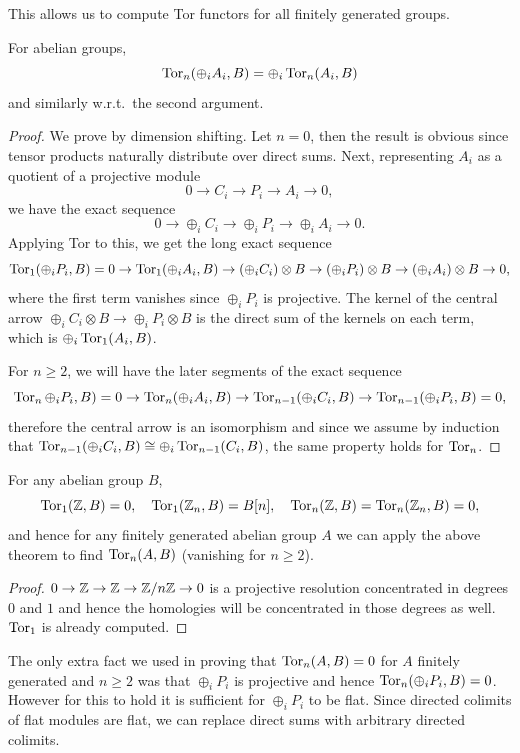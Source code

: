 This allows us to compute Tor functors for all finitely generated groups.

\begin{thm}
    For abelian groups,
    \[\operatorname{Tor}_n(\oplus_i A_i,B)=\oplus_i \operatorname{Tor}_n(A_i,B)\]
    and similarly w.r.t.\ the second argument.
\end{thm}
\begin{proof}
    We prove by dimension shifting. Let $n=0$, then the result is obvious since tensor products naturally distribute over direct sums.
     Next, representing $A_i$ as a quotient of a projective module
     \[0\to C_i\to P_i\to A_i\to 0,\]
     we have the exact sequence
     \[0\to \oplus_i C_i\to \oplus_i P_i\to \oplus_i A_i\to 0.\]
     Applying Tor to this, we get the long exact sequence
     \[\operatorname{Tor}_1(\oplus_i P_i,B)=0\to\operatorname{Tor}_1(\oplus_i A_i,B)\to (\oplus_i C_i)\otimes B\to (\oplus_i P_i)\otimes B\to (\oplus_i A_i)\otimes B\to 0,\]
     where the first term vanishes since $\oplus_i P_i$ is projective. The kernel of the central arrow $\oplus_i C_i\otimes B\to \oplus_i P_i\otimes B$ is the direct sum of the kernels on each term, which is $\oplus_i\operatorname{Tor}_1(A_i,B)$.

     For $n\geq 2$, we will have the later segments of the exact sequence
     \[\operatorname{Tor}_n\oplus_i P_i,B)=0\to \operatorname{Tor}_n(\oplus_iA_i,B)\to \operatorname{Tor}_{n-1}(\oplus_iC_i,B)\to \operatorname{Tor}_{n-1}(\oplus_i P_i,B)=0,\]
     therefore the central arrow is an isomorphism and since we assume by induction that $\operatorname{Tor}_{n-1}(\oplus_iC_i,B)\cong\oplus_i\operatorname{Tor}_{n-1}(C_i,B)$, the same property holds for $\operatorname{Tor}_n$.
\end{proof}
\begin{cor}
    For any abelian group $B$,
    \[\operatorname{Tor}_1(\mathbb{Z},B)=0,\quad \operatorname{Tor}_1(\mathbb{Z}_n,B)=B[n],\quad \operatorname{Tor}_n(\mathbb{Z},B)=\operatorname{Tor}_n(\mathbb{Z}_n,B)=0,\]
    and hence for any finitely generated abelian group $A$ we can apply the above theorem to find $\operatorname{Tor}_n(A,B)$ (vanishing for $n\geq 2$).
\end{cor}
\begin{proof}
    $0\to \mathbb{Z}\to \mathbb{Z}\to \mathbb{Z}\slash n\mathbb{Z} \to 0$ is a projective resolution concentrated in degrees $0$ and $1$ and hence the homologies will be concentrated in those degrees as well. $\operatorname{Tor}_1$ is already computed.
\end{proof}

The only extra fact we used in proving that $\operatorname{Tor}_n(A,B)=0$ for $A$ finitely generated and $n\geq 2$ was that $\oplus_i P_i$ is projective and hence $\operatorname{Tor}_n(\oplus_i P_i,B)=0$. However for this to hold it is sufficient for $\oplus_i P_i$ to be flat. Since directed colimits of flat modules are flat, we can replace direct sums with arbitrary directed colimits.


